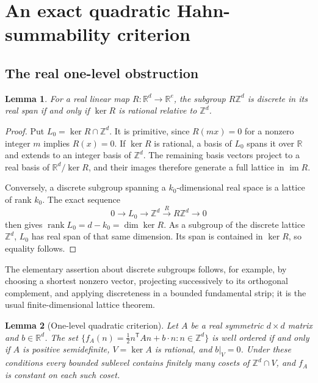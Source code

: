 \documentclass[11pt,letterpaper]{article}
\newtheorem{lemma}[lemma]{Lemma}
\theoremstyle{definition}
\newcommand{\R}{\mathbb R}
\newcommand{\Z}{\mathbb Z}
\begin{document}
\section{An exact quadratic Hahn-summability criterion}\label{tate:theta:sec:quadratic}

\subsection{The real one-level obstruction}

\begin{lemma}\label{tate:theta:lem:latticeprojection}
For a real linear map $R:\R^d\to\R^e$, the subgroup $R\Z^d$ is discrete in
its real span if and only if $\ker R$ is rational relative to $\Z^d$.
\end{lemma}

\begin{proof}
Put $L_0=\ker R\cap\Z^d$. It is primitive, since $R(mx)=0$ for a
nonzero integer $m$ implies $R(x)=0$. If $\ker R$ is rational, a basis
of $L_0$ spans it over $\R$ and extends to an integer basis of $\Z^d$.
The remaining basis vectors project to a real basis of
$\R^d/\ker R$, and their images therefore generate a full lattice in
$\operatorname{im}R$.

Conversely, a discrete subgroup spanning a $k_0$-dimensional real space
is a lattice of rank $k_0$. The exact sequence
\[
 0\longrightarrow L_0\longrightarrow\Z^d
   \xrightarrow{R}R\Z^d\longrightarrow0
\]
then gives $\operatorname{rank}L_0=d-k_0=\dim\ker R$.
As a subgroup of the discrete lattice $\Z^d$, $L_0$ has real span of
that same dimension. Its span is contained in $\ker R$, so equality
follows.
\end{proof}

The elementary assertion about discrete subgroups follows, for example, by
choosing a shortest nonzero vector, projecting successively to its
orthogonal complement, and applying discreteness in a bounded fundamental
strip; it is the usual finite-dimensional lattice theorem.

\begin{lemma}[One-level quadratic criterion]\label{tate:theta:lem:onelevel}
Let $A$ be a real symmetric $d\times d$ matrix and $b\in\R^d$. The set
$\{f_A(n)=\tfrac12n^{\mathsf T}An+b\cdot n:n\in\Z^d\}$ is well ordered if
and only if $A$ is positive semidefinite, $V=\ker A$ is rational, and
$b|_V=0$. Under these conditions every bounded sublevel contains finitely
many cosets of $\Z^d\cap V$, and $f_A$ is constant on each such coset.
\end{lemma}
\end{document}

